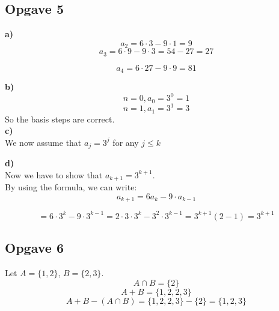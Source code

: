 \documentclass[12pt]{article}
\begin{document}
\newpage

\subsection{Opgave 5} 

\textbf{a)} \\
$$
a_2 = 6 \cdot 3 - 9 \cdot 1 = 9
$$
$$
a_3 = 6 \cdot 9 - 9 \cdot 3 = 54 - 27 = 27
$$

$$
a_4 = 6 \cdot 27 - 9 \cdot 9 = 81
$$

\textbf{b)} \\

$$
n = 0, a_0 = 3^0 = 1
$$
$$
n = 1, a_1 = 3^1 = 3
$$
So the basis steps are correct. \\

\textbf{c)} \\

We now assume that $a_j = 3^j$ for any $j \leq k$ 

\textbf{d)} \\

Now we have to show that $a_{k+1} = 3^{k+1}$. \\

By using the formula, we can write: \\

$$
a_{k+1} = 6a_k - 9 \cdot a_{k-1}
$$

$$
= 6 \cdot 3^k - 9 \cdot 3^{k-1} = 2 \cdot 3 \cdot 3^k - 3^2 \cdot 3^{k-1} = 3^{k+1} (2-1)
= 3^{k+1}
$$

\subsection{Opgave 6}

Let $A = \{1,2\}$, $B = \{2,3\}$. \\
$$
A \cap B = \{2\}
$$
$$
A + B = \{1,2,2,3\}
$$
$$
A + B - (A \cap B) = \{1,2,2,3\} - \{2\} = \{1,2,3\}
$$
\end{document}
